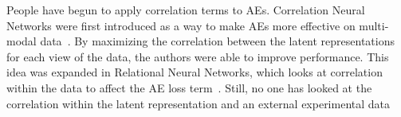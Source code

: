 
People have begun to apply correlation terms to AEs.
Correlation Neural Networks were first introduced as a way to make AEs more effective on multi-modal data~\cite{chandar2016correlational}.
By maximizing the correlation between the latent representations for each view of the data, the authors were able to improve performance.
This idea was expanded in Relational Neural Networks, which looks at correlation within the data to affect the AE loss term~\cite{meng2017relational}.
Still, no one has looked at the correlation within the latent representation and an external experimental data